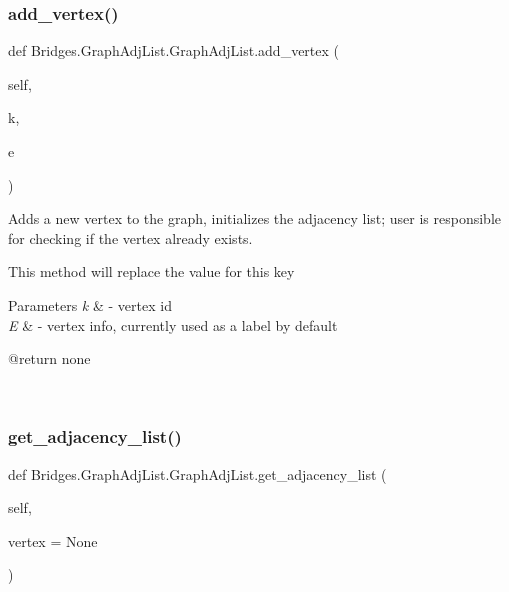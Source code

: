 \subsubsection{\texorpdfstring{add\+\_\+vertex()}{add\_vertex()}}
{\footnotesize\ttfamily def Bridges.\+Graph\+Adj\+List.\+Graph\+Adj\+List.\+add\+\_\+vertex (\begin{DoxyParamCaption}\item[{}]{self,  }\item[{}]{k,  }\item[{}]{e }\end{DoxyParamCaption})}



Adds a new vertex to the graph, initializes the adjacency list; user is responsible for checking if the vertex already exists. 

This method will replace the value for this key


\begin{DoxyParams}{Parameters}
{\em k} & -\/ vertex id \\
\hline
{\em E} & -\/ vertex info, currently used as a label by default \begin{DoxyVerb}@return none\end{DoxyVerb}
 \\
\hline
\end{DoxyParams}
\mbox{\label{class_bridges_1_1_graph_adj_list_1_1_graph_adj_list_aebaf6255dd41180764474ca5eff5f474}} 
\subsubsection{\texorpdfstring{get\+\_\+adjacency\+\_\+list()}{get\_adjacency\_list()}}
{\footnotesize\ttfamily def Bridges.\+Graph\+Adj\+List.\+Graph\+Adj\+List.\+get\+\_\+adjacency\+\_\+list (\begin{DoxyParamCaption}\item[{}]{self,  }\item[{}]{vertex = {\ttfamily None} }\end{DoxyParamCaption})}



